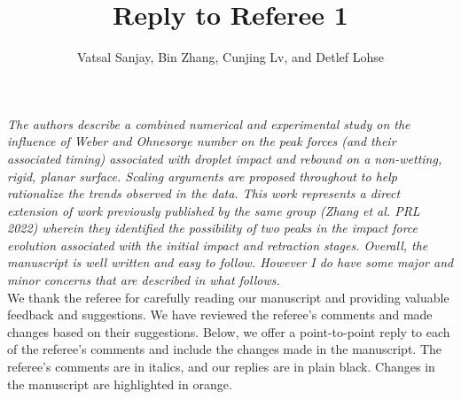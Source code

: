 \documentclass[]{article}
\title{Reply to Referee 1}
\author{Vatsal Sanjay, Bin Zhang, Cunjing Lv, and Detlef Lohse}
\date{}
\begin{document}
	\maketitle
	
\textit{The authors describe a combined numerical and experimental study on the influence of Weber and Ohnesorge number on the peak forces (and their associated timing) associated with droplet impact and rebound on a non-wetting, rigid, planar surface. Scaling arguments are proposed throughout to help rationalize the trends observed in the data. This work represents a direct extension of work previously published by the same group (Zhang et al. PRL 2022) wherein they identified the possibility of two peaks in the impact force evolution associated with the initial impact and retraction stages. Overall, the manuscript is well written and easy to follow. However I do have some major and minor concerns that are described in what follows.}\\[2mm]

We thank the referee for carefully reading our manuscript and providing valuable feedback and suggestions. We have reviewed the referee's comments and made changes based on their suggestions. Below, we offer a point-to-point reply to each of the referee's comments and include the changes made in the manuscript. The referee's comments are in italics, and our replies are in plain black. Changes in the manuscript are highlighted in orange.
\end{document}
